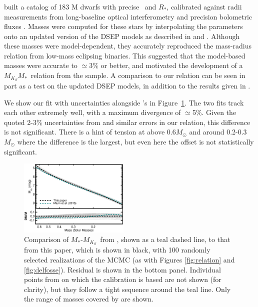 \documentclass[twocolumn]{aastex62}
\newcommand{\mks}{$M_{K_S}$}
\newcommand{\mmk}{$M_{K_S}$\textendash$M_*$}
\begin{document}
\subsubsection{\citet{Mann2015b}}

\citet{Mann2015b} built a catalog of 183 M dwarfs with precise \teff\ and $R_*$, calibrated against radii measurements from long-baseline optical interferometry \citep{Boyajian2012} and precision bolometric fluxes \citep[e.g.,][]{Mann2015a,2015MNRAS.447..846B}. Masses were computed for these stars by interpolating the parameters onto an updated version of the DSEP models as described in \citet{Feiden2013,Feiden2014} and \citet{Muirhead2014}. Although these masses were model-dependent, they accurately reproduced the mass-radius relation from low-mass eclipsing binaries. This suggested that the model-based masses were accurate to $\simeq$3\% or better, and motivated the development of a \mmk\ relation from the \citet{Mann2015b} sample. A comparison to our relation can be seen in part as a test on the updated DSEP models, in addition to the results given in \citet{Mann2015b}. 

We show our fit with uncertainties alongside \citet{Mann2015b}'s in Figure~\ref{fig:mann}. The two fits track each other extremely well, with a maximum divergence of $\simeq$5\%. Given the quoted 2-3\% uncertainties from \citet{Mann2015b} and similar errors in our relation, this difference is not significant. There is a hint of tension at above 0.6$M_\odot$ and around 0.2-0.3$M_\odot$ where the difference is the largest, but even here the offset is not statistically significant.  

\begin{figure}[htb]
\begin{center}
\includegraphics[width=0.47\textwidth]{Mann_comp.eps}
\caption{Comparison of $M_*$-\mks\ from \citet{Mann2015b}, shown as a teal dashed line, to that from this paper, which is shown in black, with 100 randomly selected realizations of the MCMC (as with Figures \ref{fig:relation} and \ref{fig:delfosse}). Residual is shown in the bottom panel. Individual points from \citet{Mann2015b} on which the calibration is based are not shown (for clarity), but they follow a tight sequence around the teal line. Only the range of masses covered by \citet{Mann2015b} are shown. }
\label{fig:mann}
\end{center}
\end{figure}
\end{document}
